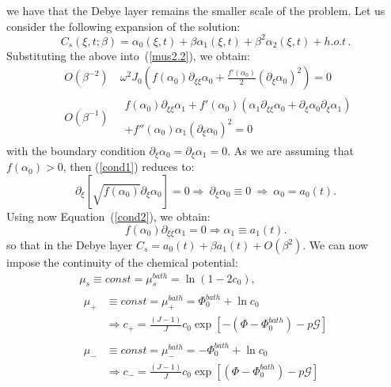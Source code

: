 \documentclass[12pt]{extarticle}
\begin{document}
we have that the Debye layer remains the smaller scale of the problem. Let us consider the following expansion of the solution:
\begin{equation}
C_s(\xi,t;\beta) = \alpha_0(\xi,t) + \beta \alpha_1(\xi,t) + \beta^2 \alpha_2(\xi,t)+ h.o.t\,. 
\end{equation}
Substituting the above into~(\ref{mus2.2}), we obtain:
\begin{eqnarray}
&O(\beta^{-2})& \ \omega^2 J_0\left(f(\alpha_0)\partial_{\xi\xi}\alpha_0+ \frac{f'(\alpha_0)}{2}(\partial_\xi \alpha_0)^2\right)=0\label{cond1}\\
&O(\beta^{-1})& \ \begin{aligned}
f(\alpha_0)\partial_{\xi\xi}\alpha_1+ f'(\alpha_0)\left(\alpha_1\partial_{\xi\xi}\alpha_0+\partial_\xi \alpha_0\partial_\xi \alpha_1\right)
\\+f''(\alpha_0)\alpha_1(\partial_\xi \alpha_0)^2=0 \label{cond2}
\end{aligned}
\end{eqnarray} 
with the boundary condition $\partial_\xi \alpha_0=\partial_\xi \alpha_1=0$. 
As we are assuming that $f(\alpha_0)>0$, then (\ref{cond1}) reduces to:
\begin{equation}
\partial_{\xi}\left[ \sqrt{f(\alpha_0)}\partial_\xi \alpha_0\right]=0 \Rightarrow \ \partial_\xi \alpha_0\equiv 0\  \Rightarrow \ \alpha_0= a_0(t).
\end{equation} 
Using now Equation~(\ref{cond2}), we obtain:
\begin{equation}
f(\alpha_0)\partial_{\xi\xi}\alpha_1 = 0  \Rightarrow \alpha_1 \equiv a_1(t).
\end{equation} 
so that in the Debye layer $C_s= a_0(t) + \beta a_1(t) + O(\beta^2)$.
We can now impose the continuity of the chemical potential:
\begin{gather}
\mu_s \equiv const = \mu^{bath}_s= \ln(1-2c_0),\\
\begin{aligned}
\mu_+ &\equiv const = \mu^{bath}_+=  \Phi_0^{bath} + \ln c_0 \\&\Rightarrow c_+=\frac{(J-1)}{J}c_0\exp[-(\Phi-\Phi_0^{bath})-p\mathcal{G}]
\end{aligned}\\
\begin{aligned}
\mu_- &\equiv const = \mu^{bath}_-= - \Phi_0^{bath} + \ln c_0\\ &\Rightarrow c_-=\frac{(J-1)}{J}c_0\exp[(\Phi-\Phi_0^{bath})-p\mathcal{G}]
\end{aligned}
\end{gather}
\end{document}
